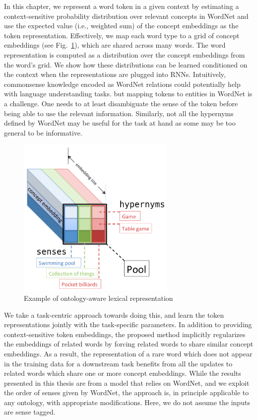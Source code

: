 In this chapter, we represent a word token in a given context by estimating a 
context-sensitive probability distribution over relevant concepts in WordNet 
\citep{miller1995wordnet} and use the expected value (i.e., weighted sum) of the 
concept embeddings as the token representation.
Effectively, we map each word type to a grid of concept embeddings (see 
Fig.~\ref{fig:ontolstm_tensor}), which are shared across many words. The word 
representation is computed as a distribution over the concept embeddings from 
the word's grid. We show how these distributions can be 
learned conditioned on the context when the representations are plugged into 
RNNs.
Intuitively, commonsense knowledge encoded as WordNet relations could 
potentially help with language understanding tasks. 
but mapping tokens to entities in WordNet is a challenge. One needs to at least 
disambiguate the sense of the token before being able to use the relevant 
information. Similarly, not all the hypernyms defined by WordNet may be useful 
for the task at hand as some may be too general to be informative.
 
\begin{figure}[t]
\begin{center}
\includegraphics[width=3in]{figures/tensor2.png}
\caption{Example of ontology-aware lexical representation}
\label{fig:ontolstm_tensor}
\end{center}
\end{figure}

We take a task-centric approach towards doing this, and learn the token 
representations jointly with the task-specific parameters.
In addition to providing context-sensitive token embeddings, the proposed method 
implicitly regularizes the embeddings of related words by forcing related words 
to share similar concept embeddings. 
As a result, the representation of a rare word which does not appear in the 
training data for a downstream task benefits from all the updates to related 
words which share one or more concept embeddings. While the results presented in this thesis are from a model that relies on WordNet, 
and we exploit the order of senses given by WordNet, the approach is, in principle 
applicable to any ontology, with appropriate modifications. Here, we do not assume the inputs are 
sense tagged.

